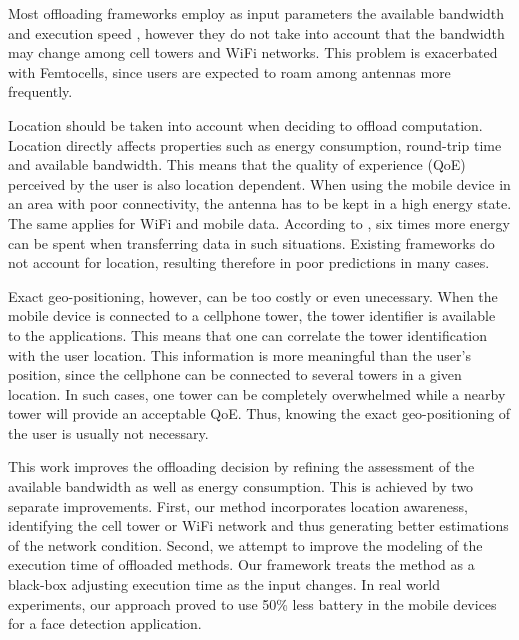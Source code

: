 \documentclass[10pt, conference, letterpaper]{IEEEtran}
\begin{document}
  
Most offloading frameworks employ as input parameters the available bandwidth and execution speed \cite{Cuervo:2010:MMS:1814433.1814441,Chun:2011:CEE:1966445.1966473,Shi:2014:CCO:2632951.2632958}, however they do not take into account that the bandwidth may change among cell towers and WiFi networks. This problem is exacerbated with Femtocells, since users are expected to roam among antennas more frequently.
 
Location should be taken into account when deciding to offload computation. Location directly affects properties such as energy consumption, round-trip time and available bandwidth. This means that the quality of experience (QoE) perceived by the user is also location dependent. When using the mobile device in an area with poor connectivity, the antenna has to be kept in a high energy state. The same applies for WiFi and mobile data. According to \cite{Schulman10bartendr:a}, six times more energy can be spent when transferring data in such situations. Existing frameworks do not account for location, resulting therefore in poor predictions in many cases.
   
 Exact geo-positioning, however, can be too costly or even unecessary. When the mobile device is connected to a cellphone tower, the tower identifier is available to the applications. This means that one can  correlate the tower identification with the user location. This information is more meaningful than the user's position, since the cellphone can be connected to several towers in a given location. In such cases, one tower can be completely overwhelmed while a nearby tower will provide an acceptable QoE. Thus,  knowing the exact geo-positioning of the user is usually not necessary. 
   

This work improves the offloading decision by refining the assessment of the available bandwidth as well as energy consumption. This is achieved by two separate improvements. First, our method incorporates location awareness, identifying the cell tower or WiFi network and thus generating better estimations of the network condition. Second, we attempt to improve the modeling of the execution time of offloaded methods. Our framework treats the method as a black-box adjusting execution time as the input changes. In real world experiments, our approach proved to use 50\% less battery in the mobile devices for a face detection application.
\end{document}
